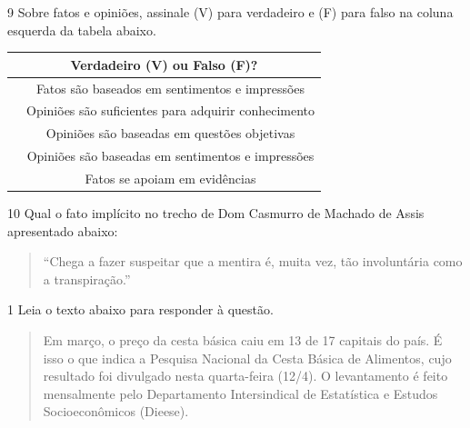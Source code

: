 {\num{9} Sobre fatos e opiniões, assinale (V) para verdadeiro e (F) 
para falso na coluna esquerda da tabela abaixo.

\begin{table}[]
\begin{tabular}{|lc|}
\hline
\multicolumn{2}{|c|}{\cellcolor[HTML]{DAE8FC}\textbf{Verdadeiro (V) ou Falso (F)?}} \\ \hline
\multicolumn{1}{|l|}{}     & Fatos são baseados em sentimentos e impressões         \\ \hline
\multicolumn{1}{|l|}{}     & Opiniões são suficientes para adquirir conhecimento    \\ \hline
\multicolumn{1}{|l|}{}     & Opiniões são baseadas em questões objetivas            \\ \hline
\multicolumn{1}{|l|}{}     & Opiniões são baseadas em sentimentos e impressões      \\ \hline
\multicolumn{1}{|l|}{}     & Fatos se apoiam em evidências                          \\ \hline
\end{tabular}
\end{table}


\num{10} Qual o fato implícito no trecho de Dom Casmurro de Machado de Assis apresentado abaixo:

\begin{quote}

``Chega a fazer suspeitar que a mentira é, muita vez, tão involuntária
como a transpiração.''

\end{quote}



\num{1} Leia o texto abaixo para responder à questão.

\begin{quote}

Em março, o preço da cesta básica caiu em 13 de 17 capitais do país. É
isso o que indica a Pesquisa Nacional da Cesta Básica de Alimentos, cujo
resultado foi divulgado nesta quarta-feira (12/4). O levantamento é
feito mensalmente pelo Departamento Intersindical de Estatística e
Estudos Socioeconômicos (Dieese).


\end{quote}}
